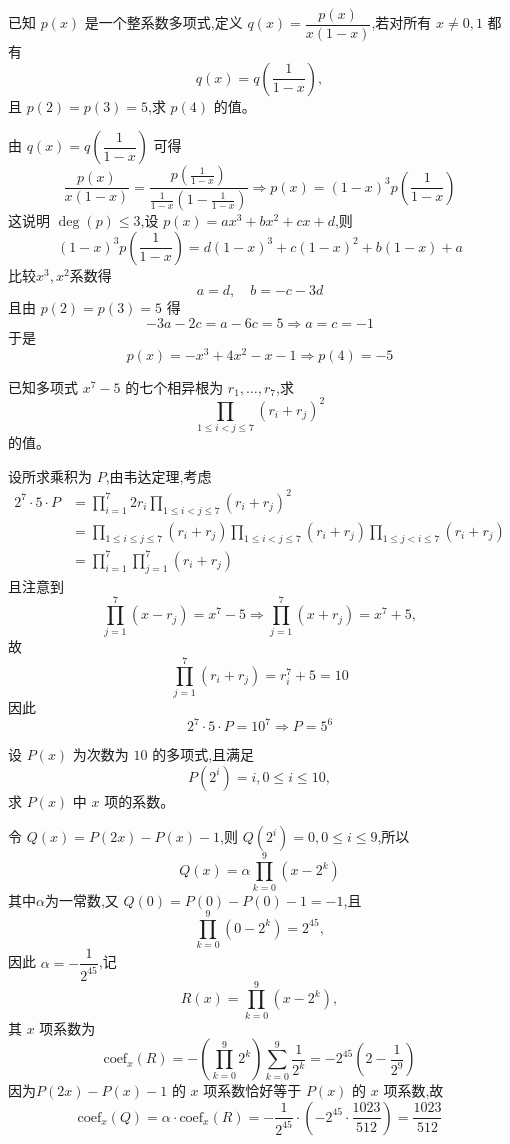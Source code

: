 \begin{questions}
    \question 已知 $p(x)$ 是一个整系数多项式,定义 $q(x)=\dfrac{p(x)}{x(1-x)}$,若对所有 $x\neq 0,1$ 都有
    \[
    q(x) = q\left(\frac{1}{1-x}\right),
    \]
    且 $p(2)=p(3)=5$,求 $p(4)$ 的值。
    \begin{solution}
        由 $q(x)=q\left(\dfrac{1}{1-x}\right)$ 可得
        \[
        \frac{p(x)}{x(1-x)} = \frac{p\left(\frac{1}{1-x}\right)}{\frac{1}{1-x}\left(1-\frac{1}{1-x}\right)} \Rightarrow p(x) = (1-x)^3 p\left(\frac{1}{1-x}\right)
        \]
        这说明 $\deg(p)\le 3$,设 $p(x)=ax^3+bx^2+cx+d$,则
        \[
        (1-x)^3 p\left(\frac{1}{1-x}\right)=d(1-x)^3+c(1-x)^2+b(1-x)+a
        \]
        比较$x^3,x^2$系数得
        \[
        a=d, \quad b=-c-3d
        \]
        且由 $p(2)=p(3)=5$ 得
        \[
        -3a - 2c = a - 6c =5 \Rightarrow a=c=-1
        \]
        于是
        \[
        p(x) = -x^3 +4x^2 - x -1 \Rightarrow p(4) = -5
        \]
    \end{solution}

    \question 已知多项式 $x^7 - 5$ 的七个相异根为 $r_1, \dots, r_7$,求
    \[
    \prod_{1 \le i < j \le 7} (r_i + r_j)^2
    \] 的值。
    \begin{solution}
        设所求乘积为 $P$,由韦达定理,考虑
        \begin{align*}
        2^7 \cdot 5 \cdot P 
        &= \prod_{i=1}^{7} 2 r_i \prod_{1 \le i < j \le 7} (r_i + r_j)^2\\
        &= \prod_{1 \le i \le j \le 7} (r_i + r_j) \prod_{1 \le i < j \le 7} (r_i + r_j) \prod_{1 \le j < i \le 7} (r_i + r_j)\\
        &= \prod_{i=1}^{7} \prod_{j=1}^{7} (r_i + r_j)
        \end{align*}
        且注意到
        \[
        \prod_{j=1}^7(x-r_j) = x^7 - 5 \Rightarrow \prod_{j=1}^7(x+r_j) = x^7 + 5,
        \]
        故
        \[
        \prod_{j=1}^{7} (r_i + r_j) = r_i^7 + 5 = 10
        \]
        因此
        \[
        2^7 \cdot 5 \cdot P = 10^7 \Rightarrow P = 5^6
        \]
    \end{solution}

    \question 设 $P(x)$ 为次数为 $10$ 的多项式,且满足 
    \[
    P(2^i)=i,0\le i\le 10,
    \]
    求 $P(x)$ 中 $x$ 项的系数。
    \begin{solution}
        令 $Q(x)=P(2x)-P(x)-1$,则 $Q(2^i)=0,0\le i\le9$,所以
        \[
        Q(x)=\alpha\prod_{k=0}^{9}(x-2^k)
        \]
        其中$\alpha$为一常数,又 $Q(0)=P(0)-P(0)-1=-1$,且
        \[
        \prod_{k=0}^{9}(0-2^k)=2^{45},
        \]
        因此 $\alpha=-\dfrac{1}{2^{45}}$,记 
        \[
        R(x)=\prod_{k=0}^{9}(x-2^k),
        \]
        其 $x$ 项系数为
        \[
        \text{coef}_{x}(R) = -\left(\prod_{k=0}^{9}2^k\right)\sum_{k=0}^{9}\frac{1}{2^k}
        = -2^{45}\left(2-\frac{1}{2^9}\right)
        \]
        因为$P(2x)-P(x)-1$ 的 $x$ 项系数恰好等于 $P(x)$ 的 $x$ 项系数,故
        \[
        \text{coef}_{x}(Q)=\alpha\cdot\text{coef}_{x}(R)
        = -\frac{1}{2^{45}}\cdot\left(-2^{45}\cdot\frac{1023}{512}\right)=\frac{1023}{512}
        \]
    \end{solution}


\end{questions}
